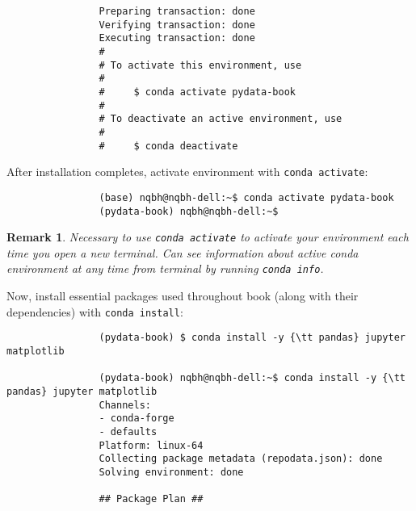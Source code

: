 \documentclass{article}
\newtheorem{remark}{Remark}
\begin{document}
\begin{itemize}
\begin{itemize}
\begin{itemize}
\begin{verbatim}
				Preparing transaction: done                                                     
				Verifying transaction: done                                                     
				Executing transaction: done                                                     
				#                                                                               
				# To activate this environment, use                                             
				#                                                                               
				#     $ conda activate pydata-book                                              
				#                                                                               
				# To deactivate an active environment, use                                      
				#                                                                               
				#     $ conda deactivate
			\end{verbatim}
			After installation completes, activate environment with {\tt conda activate}:
			\begin{verbatim}
				(base) nqbh@nqbh-dell:~$ conda activate pydata-book                             
				(pydata-book) nqbh@nqbh-dell:~$
			\end{verbatim}
			
			\begin{remark}
				Necessary to use {\tt conda activate} to activate your environment each time you open a new terminal. Can see information about active conda environment at any time from terminal by running {\tt conda info}.
			\end{remark}
			Now, install essential packages used throughout book (along with their dependencies) with {\tt conda install}:
			\begin{verbatim}
				(pydata-book) $ conda install -y {\tt pandas} jupyter matplotlib
				
				(pydata-book) nqbh@nqbh-dell:~$ conda install -y {\tt pandas} jupyter matplotlib      
				Channels:                                                                       
				- conda-forge                                                                  
				- defaults                                                                     
				Platform: linux-64                                                              
				Collecting package metadata (repodata.json): done                               
				Solving environment: done                                                       
				
				## Package Plan ##                                                              
				

\end{verbatim}
\end{itemize}
\end{itemize}
\end{itemize}
\end{document}
